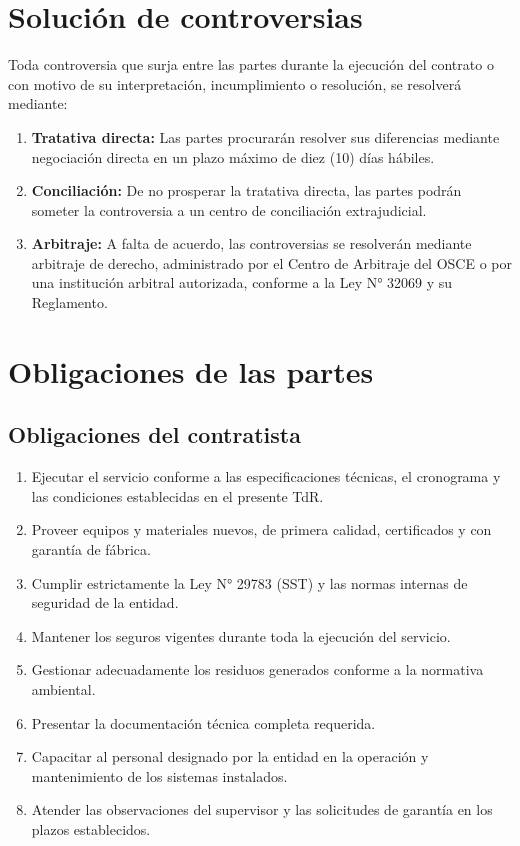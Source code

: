 \documentclass[12pt,a4paper]{article}
\begin{document}
\section{Solución de controversias}

Toda controversia que surja entre las partes durante la ejecución del contrato o con motivo de su interpretación, incumplimiento o resolución, se resolverá mediante:

\begin{enumerate}
  \item \textbf{Tratativa directa:} Las partes procurarán resolver sus diferencias mediante negociación directa en un plazo máximo de diez (10) días hábiles.
  \item \textbf{Conciliación:} De no prosperar la tratativa directa, las partes podrán someter la controversia a un centro de conciliación extrajudicial.
  \item \textbf{Arbitraje:} A falta de acuerdo, las controversias se resolverán mediante arbitraje de derecho, administrado por el Centro de Arbitraje del OSCE o por una institución arbitral autorizada, conforme a la Ley N° 32069 y su Reglamento.
\end{enumerate}

\section{Obligaciones de las partes}

\subsection{Obligaciones del contratista}

\begin{enumerate}
  \item Ejecutar el servicio conforme a las especificaciones técnicas, el cronograma y las condiciones establecidas en el presente TdR.
  \item Proveer equipos y materiales nuevos, de primera calidad, certificados y con garantía de fábrica.
  \item Cumplir estrictamente la Ley N° 29783 (SST) y las normas internas de seguridad de la entidad.
  \item Mantener los seguros vigentes durante toda la ejecución del servicio.
  \item Gestionar adecuadamente los residuos generados conforme a la normativa ambiental.
  \item Presentar la documentación técnica completa requerida.
  \item Capacitar al personal designado por la entidad en la operación y mantenimiento de los sistemas instalados.
  \item Atender las observaciones del supervisor y las solicitudes de garantía en los plazos establecidos.
\end{enumerate}
\end{document}
